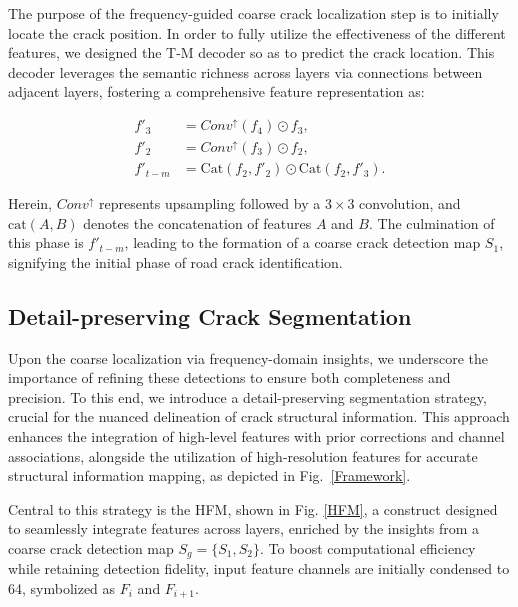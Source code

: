 \documentclass[journal]{IEEEtran}
\begin{document}
The purpose of the frequency-guided coarse crack localization step is to initially locate the crack position. In order to fully utilize the effectiveness of the different features, we designed the T-M decoder so as to predict the crack location. This decoder leverages the semantic richness across layers via connections between adjacent layers, fostering a comprehensive feature representation as:

\begin{equation}
\begin{split}
    f'_3 &= Conv^ {\uparrow }(f_4)   \odot f_3, \\
    f'_2 &= Conv^ {\uparrow }(f_3)   \odot f_2, \\
    f'_{t-m} &= \text{Cat}(f_2,f'_2)  \odot \text{Cat}(f_2,f'_3).
\end{split}
\end{equation}

Herein,  $Conv^ {\uparrow }$ represents upsampling followed by a $3 \times 3$ convolution, 
and $\text{cat}(A, B)$ denotes the concatenation of features $A$ and $B$. 
The culmination of this phase is $f'_{t-m}$, leading to the formation of a coarse crack detection map $S_1$, 
signifying the initial phase of road crack identification.



\subsection{{Detail-preserving Crack Segmentation}} \label{sec:Detail-preserving-Fine-Localization}

Upon the coarse localization via frequency-domain insights, we underscore the importance of refining these detections to ensure both completeness and precision. To this end, we introduce a detail-preserving segmentation strategy, crucial for the nuanced delineation of crack structural information. This approach enhances the integration of high-level features with prior corrections and channel associations, alongside the utilization of high-resolution features for accurate structural information mapping, as depicted in Fig.~\ref{Framework}.

Central to this strategy is the HFM, shown in Fig. \ref{HFM}, a construct designed to seamlessly integrate features across layers, enriched by the insights from a coarse crack detection map $S_g = \{S_1, S_2\}$. To boost computational efficiency while retaining detection fidelity, input feature channels are initially condensed to 64, symbolized as $F_i$ and $F_{i+1}$.
\end{document}
